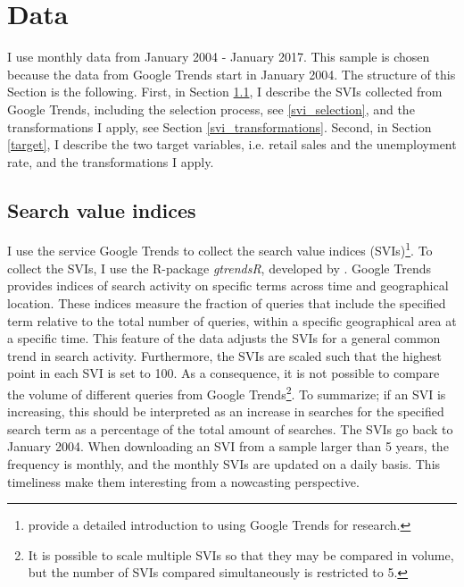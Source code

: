 \section{Data}\label{data}

I use monthly data from January 2004 - January 2017. This sample is chosen because the data from Google Trends start in January 2004. The structure of this Section is the following. First, in Section \ref{svi}, I describe the SVIs collected from Google Trends, including the selection process, see \ref{svi_selection}, and the transformations I apply, see Section \ref{svi_transformations}. Second, in Section \ref{target}, I describe the two target variables, i.e. retail sales and the unemployment rate, and the transformations I apply.

\subsection{Search value indices}\label{svi}

I use the service Google Trends to collect the search value indices (SVIs)\footnote{\textcite{stephens2014} provide a detailed introduction to using Google Trends for research.}. To collect the SVIs, I use the R-package \textit{gtrendsR}, developed by \textcite{gtrendsR}. Google Trends provides indices of search activity on specific terms across time and geographical location. These indices measure the fraction of queries that include the specified term relative to the total number of queries, within a specific geographical area at a specific time. This feature of the data adjusts the SVIs for a general common trend in search activity. Furthermore, the SVIs are scaled such that the highest point in each SVI is set to 100. As a consequence, it is not possible to compare the volume of different queries from Google Trends\footnote{It is possible to scale multiple SVIs so that they may be compared in volume, but the number of SVIs compared simultaneously is restricted to 5.}. To summarize; if an SVI is increasing, this should be interpreted as an increase in searches for the specified search term as a percentage of the total amount of searches. The SVIs go back to January 2004. When downloading an SVI from a sample larger than 5 years, the frequency is monthly, and the monthly SVIs are updated on a daily basis. This timeliness make them interesting from a nowcasting perspective.

